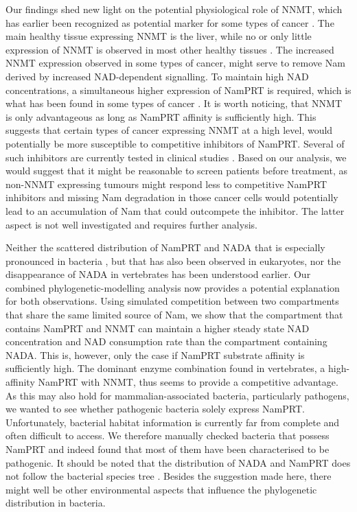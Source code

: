 Our findings shed new light on the potential physiological role of NNMT, which has earlier been recognized as potential marker for some types of cancer \citep[e.g.][]{Okamura1998}. The main healthy tissue expressing NNMT is the liver, while no or only little expression of NNMT is observed in most other healthy tissues \citep{Aksoy1994}. The increased NNMT expression observed in some types of cancer, might serve to remove Nam derived by increased NAD-dependent signalling. To maintain high NAD concentrations, a simultaneous higher expression of NamPRT is required, which is what has been found in some types of cancer \citep{Bi2011,Wang2011}. It is worth noticing, that NNMT is only advantageous as long as NamPRT affinity is sufficiently high. This suggests that certain types of cancer expressing NNMT at a high level, would potentially be more susceptible to competitive inhibitors of NamPRT. Several of such inhibitors are currently tested in clinical studies \citep{EspindolaNetto2017,Xu2015SR}. Based on our analysis, we would suggest that it might be reasonable to screen patients before treatment, as non-NNMT expressing tumours might respond less to competitive NamPRT inhibitors and missing Nam degradation in those cancer cells would potentially lead to an accumulation of Nam that could outcompete the inhibitor. The latter aspect is not well investigated and requires further analysis.

Neither the scattered distribution of NamPRT and NADA that is especially pronounced in bacteria \citep{Gazzaniga2009}, but that has also been observed in eukaryotes, nor the disappearance of NADA in vertebrates has been understood earlier. Our combined phylogenetic-modelling analysis now provides a potential explanation for both observations. Using simulated competition between two compartments that share the same limited source of Nam, we show that the compartment that contains NamPRT and NNMT can maintain a higher steady state NAD concentration and NAD consumption rate than the compartment containing NADA. This is, however, only the case if NamPRT substrate affinity is sufficiently high. The dominant enzyme combination found in vertebrates, a high-affinity NamPRT with NNMT, thus seems to provide a competitive advantage. As this may also hold for mammalian-associated bacteria, particularly pathogens, we wanted to see whether pathogenic bacteria solely express NamPRT. Unfortunately, bacterial habitat information is currently far from complete and often difficult to access. We therefore manually checked bacteria that possess NamPRT and indeed found that most of them have been characterised to be pathogenic. It should be noted that the distribution of NADA and NamPRT does not follow the bacterial species tree \citep{Gazzaniga2009}. Besides the suggestion made here, there might well be other environmental aspects that influence the phylogenetic distribution in bacteria.

